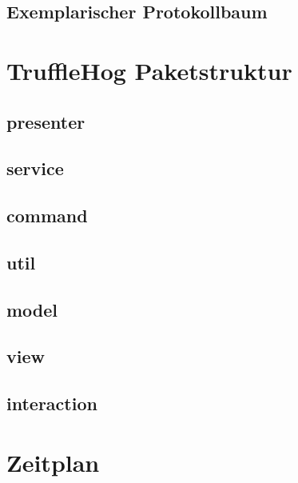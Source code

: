 \documentclass[18pt]{beamer}
\begin{document}
	\subsection{Exemplarischer Protokollbaum}
		

\section{TruffleHog Paketstruktur}
	
	\subsection{presenter}
		
	\subsection{service}
		
	\subsection{command}
		
	\subsection{util}
		
	\subsection{model}
		
		
	\subsection{view}
		
	\subsection{interaction}
		

\section{Zeitplan}

\appendix
\beginbackup
\backupend
\end{document}
